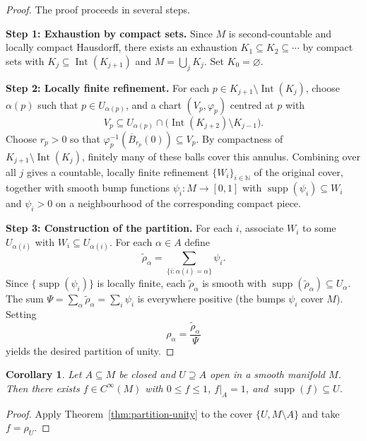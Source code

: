 \documentclass[12pt,a4paper,openany]{book}
\newtheorem{corollary}[theorem]{Corollary}
\theoremstyle{definition}
\theoremstyle{remark}
\newcommand{\N}{\mathbb{N}}
\begin{document}
\begin{proof}
The proof proceeds in several steps.

\medskip
\noindent\textbf{Step 1: Exhaustion by compact sets.}
Since $M$ is second-countable and locally compact Hausdorff, there exists an
exhaustion $K_1 \subseteq K_2 \subseteq \cdots$ by compact sets with
$K_j \subseteq \operatorname{Int}(K_{j+1})$ and $M = \bigcup_{j} K_j$.
Set $K_0 = \varnothing$.

\medskip
\noindent\textbf{Step 2: Locally finite refinement.}
For each $p \in K_{j+1} \setminus \operatorname{Int}(K_j)$, choose
$\alpha(p)$ such that $p \in U_{\alpha(p)}$, and a chart
$(V_p, \varphi_p)$ centred at $p$ with
\[
  V_p \subseteq U_{\alpha(p)} \cap
  \bigl(\operatorname{Int}(K_{j+2}) \setminus K_{j-1}\bigr).
\]
Choose $r_p > 0$ so that $\varphi_p^{-1}(\overline{B}_{r_p}(0)) \subseteq V_p$.
By compactness of $K_{j+1} \setminus \operatorname{Int}(K_j)$, finitely
many of these balls cover this annulus.  Combining over all $j$ gives a
countable, locally finite refinement $\{W_i\}_{i \in \N}$ of the original
cover, together with smooth bump functions $\psi_i \colon M \to [0,1]$ with
$\operatorname{supp}(\psi_i) \subseteq W_i$ and $\psi_i > 0$ on a
neighbourhood of the corresponding compact piece.

\medskip
\noindent\textbf{Step 3: Construction of the partition.}
For each $i$, associate $W_i$ to some $U_{\alpha(i)}$ with
$W_i \subseteq U_{\alpha(i)}$.  For each $\alpha \in A$ define
\[
  \tilde{\rho}_\alpha = \sum_{\{i : \alpha(i)=\alpha\}} \psi_i.
\]
Since $\{\operatorname{supp}(\psi_i)\}$ is locally finite, each
$\tilde{\rho}_\alpha$ is smooth with
$\operatorname{supp}(\tilde{\rho}_\alpha) \subseteq U_\alpha$.
The sum $\Psi = \sum_\alpha \tilde{\rho}_\alpha = \sum_i \psi_i$ is
everywhere positive (the bumps $\psi_i$ cover $M$).  Setting
\[
  \rho_\alpha = \frac{\tilde{\rho}_\alpha}{\Psi}
\]
yields the desired partition of unity.
\end{proof}

\begin{corollary}\label{cor:smooth-urysohn}
Let $A \subseteq M$ be closed and $U \supseteq A$ open in a smooth manifold
$M$.  Then there exists $f \in C^\infty(M)$ with $0 \leq f \leq 1$,
$f|_A = 1$, and $\operatorname{supp}(f) \subseteq U$.
\end{corollary}

\begin{proof}
Apply Theorem~\ref{thm:partition-unity} to the cover $\{U, M \setminus A\}$
and take $f = \rho_U$.
\end{proof}
\end{document}
